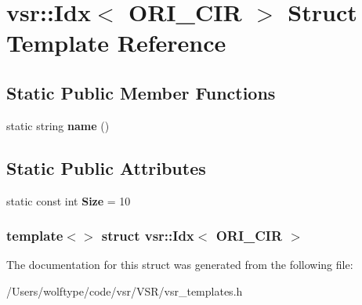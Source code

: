 \hypertarget{structvsr_1_1_idx_3_01_o_r_i___c_i_r_01_4}{\section{vsr\-:\-:Idx$<$ O\-R\-I\-\_\-\-C\-I\-R $>$ Struct Template Reference}
\label{structvsr_1_1_idx_3_01_o_r_i___c_i_r_01_4}
}
\subsection*{Static Public Member Functions}
\begin{DoxyCompactItemize}
\item 
\hypertarget{structvsr_1_1_idx_3_01_o_r_i___c_i_r_01_4_afd624b6276207a038995d9d9b640d88f}{static string {\bfseries name} ()}\label{structvsr_1_1_idx_3_01_o_r_i___c_i_r_01_4_afd624b6276207a038995d9d9b640d88f}

\end{DoxyCompactItemize}
\subsection*{Static Public Attributes}
\begin{DoxyCompactItemize}
\item 
\hypertarget{structvsr_1_1_idx_3_01_o_r_i___c_i_r_01_4_ac9aa5b738dbc726722dbbe67acbaefb1}{static const int {\bfseries Size} = 10}\label{structvsr_1_1_idx_3_01_o_r_i___c_i_r_01_4_ac9aa5b738dbc726722dbbe67acbaefb1}

\end{DoxyCompactItemize}
\subsubsection*{template$<$$>$ struct vsr\-::\-Idx$<$ O\-R\-I\-\_\-\-C\-I\-R $>$}



The documentation for this struct was generated from the following file\-:\begin{DoxyCompactItemize}
\item 
/\-Users/wolftype/code/vsr/\-V\-S\-R/vsr\-\_\-templates.\-h\end{DoxyCompactItemize}
